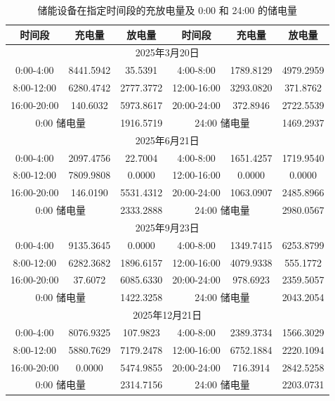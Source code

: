 \documentclass[withoutpreface,bwprint]{cumcmthesis}
\begin{document}
\begin{table}[h!]
	\centering
	\footnotesize
	\renewcommand{\arraystretch}{1.2}
	\setlength{\tabcolsep}{15pt}
	\caption{储能设备在指定时间段的充放电量及 0:00 和 24:00 的储电量}
	\label{tab:q2_spec_2}
	\begin{tabular}{|c|c|c|c|c|c|}
		\hline
		时间段 & 充电量 & 放电量 & 时间段 & 充电量 & 放电量 \\ \hline
		\multicolumn{6}{|c|}{2025年3月20日} \\ \hline
		0:00-4:00 & 8441.5942 & 35.5391 & 4:00-8:00 & 1789.8129 & 4979.2959 \\ \hline
		8:00-12:00 & 6280.4742 & 2777.3772 & 12:00-16:00 & 3293.0820 & 371.8762 \\ \hline
		16:00-20:00 & 140.6032 & 5973.8617 & 20:00-24:00 & 372.8946 & 2722.5539 \\ \hline
		\multicolumn{2}{|c|}{0:00 储电量} & 1916.5719 & \multicolumn{2}{c|}{24:00 储电量} & 1469.2937 \\ \hline
		\multicolumn{6}{|c|}{2025年6月21日} \\ \hline
		0:00-4:00 & 2097.4756 & 22.7004 & 4:00-8:00 & 1651.4257 & 1719.9540 \\ \hline
		8:00-12:00 & 7809.9808 & 0.0000 & 12:00-16:00 & 0.0000 & 0.0000 \\ \hline
		16:00-20:00 & 146.0190 & 5531.4312 & 20:00-24:00 & 1063.0907 & 2485.8966 \\ \hline
		\multicolumn{2}{|c|}{0:00 储电量} & 2333.2888 & \multicolumn{2}{c|}{24:00 储电量} & 2980.0567 \\ \hline
		\multicolumn{6}{|c|}{2025年9月23日} \\ \hline
		0:00-4:00 & 9135.3645 & 0.0000 & 4:00-8:00 & 1349.7415 & 6253.8799 \\ \hline
		8:00-12:00 & 6282.3682 & 1896.6157 & 12:00-16:00 & 4079.9338 & 555.1772 \\ \hline
		16:00-20:00 & 37.6072 & 6085.6330 & 20:00-24:00 & 978.6923 & 2359.5057 \\ \hline
		\multicolumn{2}{|c|}{0:00 储电量} & 1422.3258 & \multicolumn{2}{c|}{24:00 储电量} & 2043.2054 \\ \hline
		\multicolumn{6}{|c|}{2025年12月21日} \\ \hline
		0:00-4:00 & 8076.9325 & 107.9823 & 4:00-8:00 & 2389.3734 & 1566.3029 \\ \hline
		8:00-12:00 & 5880.7629 & 7179.2478 & 12:00-16:00 & 6752.1884 & 2220.1094 \\ \hline
		16:00-20:00 & 0.0000 & 5474.9855 & 20:00-24:00 & 716.3914 & 2842.5258 \\ \hline
		\multicolumn{2}{|c|}{0:00 储电量} & 2314.7156 & \multicolumn{2}{c|}{24:00 储电量} & 2203.0731 \\ \hline
	\end{tabular}
\end{table}
\end{document}
